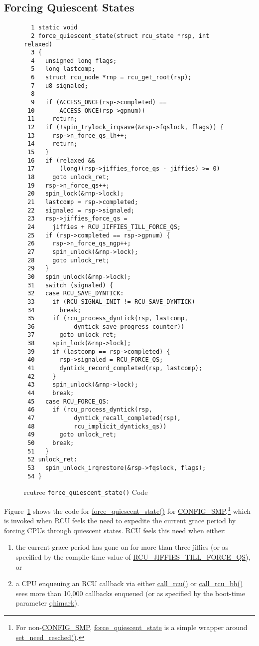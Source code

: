 \subsection{Forcing Quiescent States}
\label{app:rcuimpl:rcutreewt:Forcing Quiescent States}


\begin{figure}[htbp]
{ \scriptsize
\begin{verbatim}
  1 static void
  2 force_quiescent_state(struct rcu_state *rsp, int relaxed)
  3 {
  4   unsigned long flags;
  5   long lastcomp;
  6   struct rcu_node *rnp = rcu_get_root(rsp);
  7   u8 signaled;
  8 
  9   if (ACCESS_ONCE(rsp->completed) ==
 10       ACCESS_ONCE(rsp->gpnum))
 11     return;
 12   if (!spin_trylock_irqsave(&rsp->fqslock, flags)) {
 13     rsp->n_force_qs_lh++;
 14     return;
 15   }
 16   if (relaxed &&
 17       (long)(rsp->jiffies_force_qs - jiffies) >= 0)
 18     goto unlock_ret;
 19   rsp->n_force_qs++;
 20   spin_lock(&rnp->lock);
 21   lastcomp = rsp->completed;
 22   signaled = rsp->signaled;
 23   rsp->jiffies_force_qs =
 24     jiffies + RCU_JIFFIES_TILL_FORCE_QS;
 25   if (rsp->completed == rsp->gpnum) {
 26     rsp->n_force_qs_ngp++;
 27     spin_unlock(&rnp->lock);
 28     goto unlock_ret;
 29   }
 30   spin_unlock(&rnp->lock);
 31   switch (signaled) {
 32   case RCU_SAVE_DYNTICK:
 33     if (RCU_SIGNAL_INIT != RCU_SAVE_DYNTICK)
 34       break;
 35     if (rcu_process_dyntick(rsp, lastcomp,
 36           dyntick_save_progress_counter))
 37       goto unlock_ret;
 38     spin_lock(&rnp->lock);
 39     if (lastcomp == rsp->completed) {
 40       rsp->signaled = RCU_FORCE_QS;
 41       dyntick_record_completed(rsp, lastcomp);
 42     }
 43     spin_unlock(&rnp->lock);
 44     break;
 45   case RCU_FORCE_QS:
 46     if (rcu_process_dyntick(rsp,
 47           dyntick_recall_completed(rsp),
 48           rcu_implicit_dynticks_qs))
 49       goto unlock_ret;
 50     break;
 51   }
 52 unlock_ret:
 53   spin_unlock_irqrestore(&rsp->fqslock, flags);
 54 }
\end{verbatim}
}
\caption{rcutree {\tt force\_quiescent\_state()} Code}
\label{fig:app:rcuimpl:rcutreewt:Code for rcutree force-quiescent-state}
\end{figure}

Figure~\ref{fig:app:rcuimpl:rcutreewt:Code for rcutree force-quiescent-state}
shows the code for \url{force_quiescent_state()} for
\url{CONFIG_SMP},\footnote{
	For non-\url{CONFIG_SMP}, \url{force_quiescent_state} is a
	simple wrapper around \url{set_need_resched()}.}
which is invoked when RCU feels the need to expedite the current
grace period by forcing CPUs through quiescent states.
RCU feels this need when either:
\begin{enumerate}
\item	the current grace period has gone on for more than three jiffies
	(or as specified by the compile-time value of
	\url{RCU_JIFFIES_TILL_FORCE_QS}), or
\item	a CPU enqueuing an RCU callback via either \url{call_rcu()}
	or \url{call_rcu_bh()} sees more than 10,000 callbacks enqueued
	(or as specified by the boot-time parameter \url{qhimark}).
\end{enumerate}

